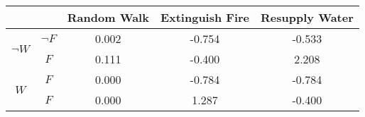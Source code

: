 \begin{center}
\begin{tabular}{|c|c|c|c|c|}
  \hline
  &   & Random Walk & Extinguish Fire & Resupply Water\\
  \hline
  \multirow{2}{*}{$\neg W$} & $\neg F$ & 0.002 & -0.754 & -0.533\\
  \cline{2-5}
   & $F$ & 0.111 & -0.400 & 2.208\\
  \hline
  \multirow{2}{*}{$W$} & $F$ & 0.000 & -0.784 & -0.784\\
  \cline{2-5}
   & $F$ & 0.000 & 1.287 & -0.400\\
  \hline
\end{tabular}
\end{center}
